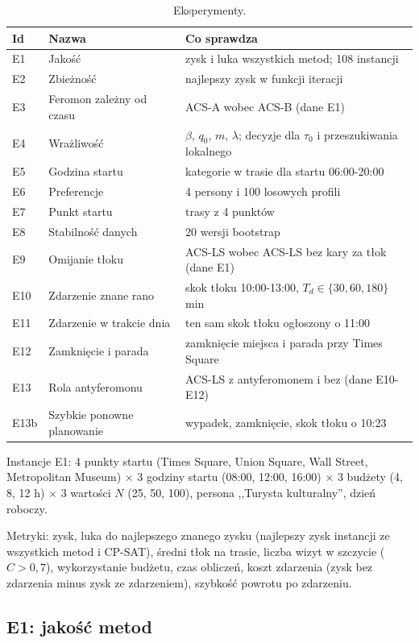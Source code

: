 \documentclass[11pt,a4paper]{article}
\begin{document}
\begin{table}[h]
\centering
\caption{Eksperymenty.}
\begin{tabular}{lll}
\toprule
Id & Nazwa & Co sprawdza \\
\midrule
E1 & Jakość & zysk i luka wszystkich metod; 108 instancji \\
E2 & Zbieżność & najlepszy zysk w funkcji iteracji \\
E3 & Feromon zależny od czasu & ACS-A wobec ACS-B (dane E1) \\
E4 & Wrażliwość & $\beta$, $q_0$, $m$, $\lambda$; decyzje dla $\tau_0$ i przeszukiwania lokalnego \\
E5 & Godzina startu & kategorie w trasie dla startu 06:00-20:00 \\
E6 & Preferencje & 4 persony i 100 losowych profili \\
E7 & Punkt startu & trasy z 4 punktów \\
E8 & Stabilność danych & 20 wersji bootstrap \\
E9 & Omijanie tłoku & ACS-LS wobec ACS-LS bez kary za tłok (dane E1) \\
E10 & Zdarzenie znane rano & skok tłoku 10:00-13:00, $T_d \in \{30, 60, 180\}$ min \\
E11 & Zdarzenie w trakcie dnia & ten sam skok tłoku ogłoszony o 11:00 \\
E12 & Zamknięcie i parada & zamknięcie miejsca i parada przy Times Square \\
E13 & Rola antyferomonu & ACS-LS z antyferomonem i bez (dane E10-E12) \\
E13b & Szybkie ponowne planowanie & wypadek, zamknięcie, skok tłoku o 10:23 \\
\bottomrule
\end{tabular}
\end{table}

Instancje E1: 4 punkty startu (Times Square, Union Square, Wall Street, Metropolitan Museum) $\times$ 3 godziny startu (08:00, 12:00, 16:00) $\times$ 3 budżety (4, 8, 12 h) $\times$ 3 wartości $N$ (25, 50, 100), persona ,,Turysta kulturalny'', dzień roboczy.

Metryki: zysk, luka do najlepszego znanego zysku (najlepszy zysk instancji ze wszystkich metod i CP-SAT), średni tłok na trasie, liczba wizyt w szczycie ($C > 0{,}7$), wykorzystanie budżetu, czas obliczeń, koszt zdarzenia (zysk bez zdarzenia minus zysk ze zdarzeniem), szybkość powrotu po zdarzeniu.

\subsection{E1: jakość metod}
\end{document}

